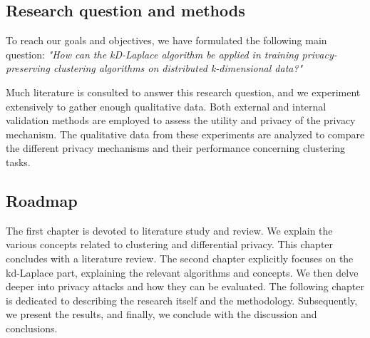 \subsection*{Research question and methods}
To reach our goals and objectives, we have formulated the following main question: \newline \newline
\textit{"How can the kD-Laplace algorithm be applied in training privacy-preserving clustering algorithms on distributed k-dimensional data?"} \newline

Much literature is consulted to answer this research question, and we experiment extensively to gather enough qualitative data.
Both external and internal validation methods are employed to assess the utility and privacy of the privacy mechanism.
The qualitative data from these experiments are analyzed to compare the different privacy mechanisms and their performance concerning clustering tasks.

\subsection*{Roadmap}
The first chapter is devoted to literature study and review.
We explain the various concepts related to clustering and differential privacy.
This chapter concludes with a literature review.
The second chapter explicitly focuses on the kd-Laplace part, explaining the relevant algorithms and concepts.
We then delve deeper into privacy attacks and how they can be evaluated. \newline
The following chapter is dedicated to describing the research itself and the methodology.
Subsequently, we present the results, and finally, we conclude with the discussion and conclusions.


